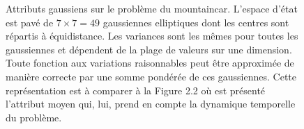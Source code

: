\documentclass[frenchb,a4paper,justified,notoc]{tufte-book}
\begin{document}
\begin{figure}
\caption[Attributs gaussiens sur le problème du ]{Attributs gaussiens sur le problème du \gls{mountaincar}. L'espace d'état est pavé de $7\times 7 = 49$ gaussiennes elliptiques dont les centres sont répartis à équidistance. Les variances sont les mêmes pour toutes les gaussiennes et dépendent de la plage de valeurs sur une dimension. Toute fonction aux variations raisonnables peut être approximée de manière correcte par une somme pondérée de ces gaussiennes. Cette représentation est à comparer à la Figure 2.2 
où est présenté l'attribut moyen qui, lui, prend en compte la dynamique temporelle du problème.}
\label{fig:mountain_car_psi}
\end{figure}
\clearpage
\end{document}
